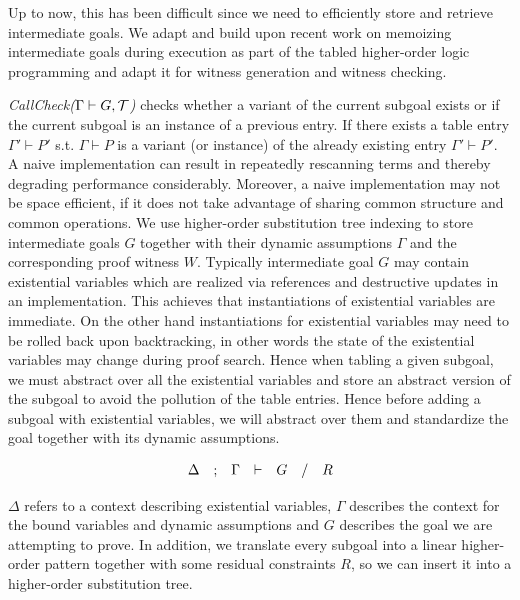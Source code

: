 \documentclass{acmconf}
\newcommand{\vd}{\vdash}
\begin{document}
Up to now, this has been difficult since we need to efficiently
store and retrieve intermediate goals. We adapt and build upon recent
work \cite{Pientka03phd} on memoizing intermediate goals during
execution as part of the tabled higher-order logic programming and
adapt it for witness generation and witness checking. 

{\em{CallCheck($\Gamma \vd G, \cal{T}$)}} checks whether a variant of
the current subgoal exists or if the current subgoal is an instance of
a previous entry. If there exists a table entry $\Gamma' \vd P'$
s.t. $\Gamma \vd P$ is a variant (or instance) of the already existing
entry $\Gamma' \vd P'$. A naive implementation can result in
repeatedly rescanning terms and thereby degrading performance
considerably. Moreover, a naive implementation may not be space
efficient, if it does not take advantage of sharing common structure
and common operations. We use higher-order substitution tree indexing
to store intermediate goals $G$ together with their dynamic
assumptions $\Gamma$ and the corresponding proof witness
$W$. Typically intermediate goal $G$ may contain existential
variables which are realized via references and destructive updates in
an implementation. This achieves that instantiations of existential variables
are immediate. On the other hand instantiations for existential
variables may need to be rolled back upon backtracking, in other words
the state of the existential variables may change during proof search.
Hence when tabling a given subgoal, we must abstract over all the
existential variables and store an abstract version of the
subgoal to avoid the pollution of the table entries.
Hence before adding a subgoal with existential variables, we will
abstract over them and standardize the goal together with its dynamic
assumptions. 

\[
\begin{array}{lclclcl}
\multicolumn{1}{c}{\Delta} & ; & \multicolumn{1}{c}{\Gamma} & \vd &
\multicolumn{1}{c}{G}
& / & \multicolumn{1}{c}{R}\\
 \end{array}
\]

$\Delta$ refers to a context describing existential variables,
$\Gamma$ describes the context for the bound variables  and dynamic
assumptions and $G$ describes the goal we are attempting to prove. 
In addition, we translate every subgoal into a linear higher-order pattern
together with some residual constraints $R$, so we can insert it into a
higher-order substitution tree.
\end{document}
